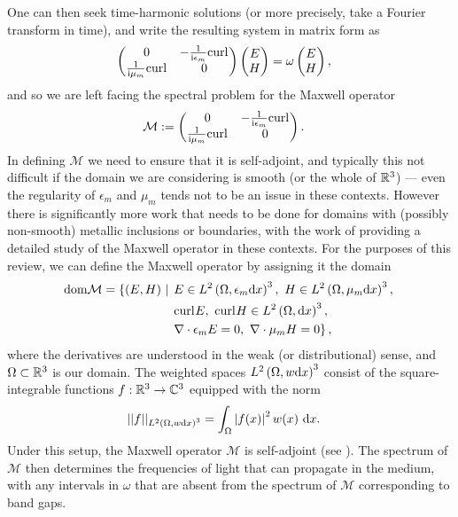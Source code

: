 One can then seek time-harmonic solutions (or more precisely, take a Fourier transform in time), and write the resulting system in matrix form as
\begin{align*}
	\begin{pmatrix}
		0 & -\frac{1}{\mathrm{i}\epsilon_m}\mathrm{curl}_{} \\
		\frac{1}{\mathrm{i}\mu_m}\mathrm{curl}_{} & 0
	\end{pmatrix}
	\begin{pmatrix} E \\ H	\end{pmatrix}
	&=
	\omega	\begin{pmatrix}	E \\ H	\end{pmatrix},
\end{align*}
and so we are left facing the spectral problem for the Maxwell operator 
\begin{align*}
	\mathcal{M} &:=
	\begin{pmatrix}
		0 & -\frac{1}{\mathrm{i}\epsilon_m}\mathrm{curl}_{} \\
		\frac{1}{\mathrm{i}\mu_m}\mathrm{curl}_{} & 0
	\end{pmatrix}.
\end{align*}
In defining $\mathcal{M}$ we need to ensure that it is self-adjoint, and typically this not difficult if the domain we are considering is smooth (or the whole of $\mathbb{R}^3$) --- even the regularity of $\epsilon_m$ and $\mu_m$ tends not to be an issue in these contexts.
However there is significantly more work that needs to be done for domains with (possibly non-smooth) metallic inclusions or boundaries, with the work of  providing a detailed study of the Maxwell operator in these contexts.
For the purposes of this review, we can define the Maxwell operator by assigning it the domain
\begin{align*}
	\mathrm{dom}{\mathcal{M}} = \left\{ \left( E,H \right) \ \middle\vert \right. 
	&
	\left. E\in L^2\left( \Omega, \epsilon_m\mathrm{d} x \right)^3, \ H\in L^2\left( \Omega, \mu_m\mathrm{d} x \right)^3, \right. \\
	&
	\left. \mathrm{curl}_{}E, \ \mathrm{curl}_{}H\in L^{2}\left( \Omega,\mathrm{d}x \right)^3, \right. \\
	&
	\left. \nabla\cdot \epsilon_m E = 0, \ \nabla\cdot \mu_m H = 0 \right\},
\end{align*}
where the derivatives are understood in the weak (or distributional) sense, and $\Omega\subset\mathbb{R}^3$ is our domain.
The weighted spaces $L^2\left( \Omega, w\mathrm{d} x \right)^3$ consist of the square-integrable functions $f:\mathbb{R}^3\rightarrow\mathbb{C}^3$ equipped with the norm
\begin{align*}
	\lvert\lvert  f  \rvert\rvert_{L^2\left( \Omega, w\mathrm{d} x \right)^3} &= \int_{\Omega}\left\lvert f(x) \right\rvert^2 w(x) \ \mathrm{d}x.
\end{align*}
Under this setup, the Maxwell operator $\mathcal{M}$ is self-adjoint (see ).
The spectrum of $\mathcal{M}$ then determines the frequencies of light that can propagate in the medium, with any intervals in $\omega$ that are absent from the spectrum of $\mathcal{M}$ corresponding to band gaps.

